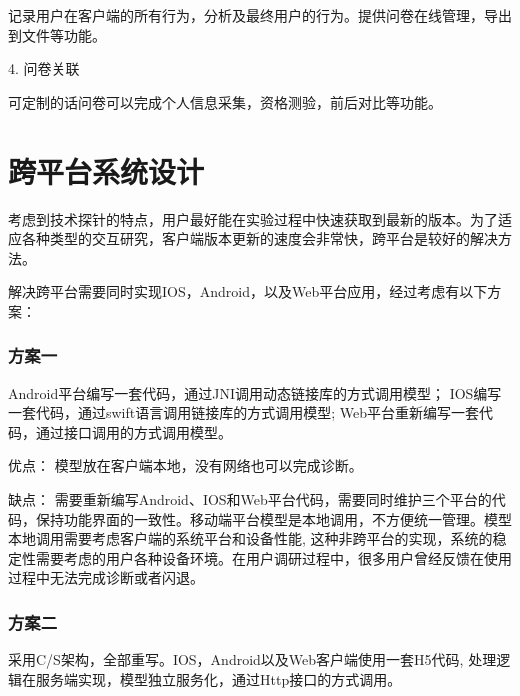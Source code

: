 记录用户在客户端的所有行为，分析及最终用户的行为。提供问卷在线管理，导出到文件等功能。

4. 问卷关联

可定制的话问卷可以完成个人信息采集，资格测验，前后对比等功能。




\section{跨平台系统设计}



考虑到技术探针的特点，用户最好能在实验过程中快速获取到最新的版本。为了适应各种类型的交互研究，客户端版本更新的速度会非常快，跨平台是较好的解决方法。

解决跨平台需要同时实现IOS，Android，以及Web平台应用，经过考虑有以下方案：

\subsubsection{方案一}
Android平台编写一套代码，通过JNI调用动态链接库的方式调用模型； IOS编写一套代码，通过swift语言调用链接库的方式调用模型; Web平台重新编写一套代码，通过接口调用的方式调用模型。

优点： 模型放在客户端本地，没有网络也可以完成诊断。

缺点： 需要重新编写Android、IOS和Web平台代码，需要同时维护三个平台的代码，保持功能界面的一致性。移动端平台模型是本地调用，不方便统一管理。模型本地调用需要考虑客户端的系统平台和设备性能,
这种非跨平台的实现，系统的稳定性需要考虑的用户各种设备环境。在用户调研过程中，很多用户曾经反馈在使用过程中无法完成诊断或者闪退。

\subsubsection{方案二}
采用C/S架构，全部重写。IOS，Android以及Web客户端使用一套H5代码, 处理逻辑在服务端实现，模型独立服务化，通过Http接口的方式调用。


